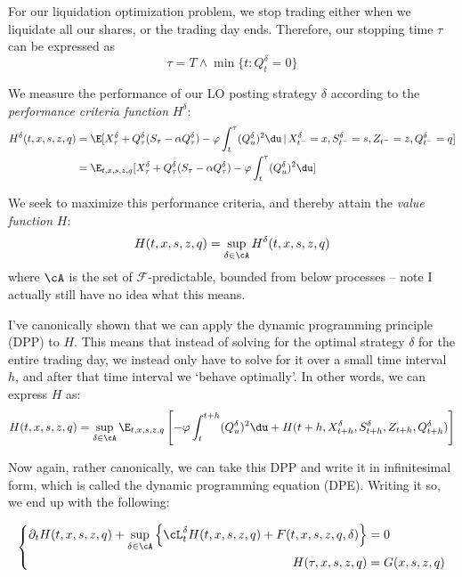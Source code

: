 \documentclass[12pt]{article}
\begin{document}
For our liquidation optimization problem, we stop trading either when we liquidate all our shares, or the trading day ends. Therefore, our stopping time $\tau$ can be expressed as 
\[ \tau = T \wedge \min \{ t: Q_t^\delta = 0 \} \]

We measure the performance of our LO posting strategy $\delta$ according to the \textit{performance criteria function} $H^\delta$:
\begin{align*}
H^\delta (t,x,s,z,q) & = \E [ X_\tau^\delta + Q_\tau^\delta(S_\tau - \alpha Q_\tau^\delta) - \varphi \int_t^\tau (Q_u^\delta)^2 \du \, | \, X_{t^-}^\delta = x, S_{t^-}^\delta = s, Z_{t^-} = z, Q_{t^-}^\delta = q] \\
& = \E_{t,x,s,z,q} [ X_\tau^\delta + Q_\tau^\delta(S_\tau - \alpha Q_\tau^\delta) - \varphi \int_t^\tau (Q_u^\delta)^2 \du ]
\end{align*} 

We seek to maximize this performance criteria, and thereby attain the \textit{value function} $H$:
\[ H(t,x,s,z,q) = \sup_{\delta \in \cA} H^\delta (t,x,s,z,q) \]
where $\cA$ is the set of $\mathcal{F}$-predictable, bounded from below processes -- note I actually still have no idea what this means.

I've canonically shown that we can apply the dynamic programming principle (DPP) to $H$. This means that instead of solving for the optimal strategy $\delta$ for the entire trading day, we instead only have to solve for it over a small time interval $h$, and after that time interval we `behave optimally'. In other words, we can express $H$ as:
\[ H(t,x,s,z,q) = \sup_{\delta \in \cA} \E_{t,x,s,z,q} \left[ -\varphi \int_t^{t+h} (Q_u^\delta)^2 \du + H(t+h, X_{t+h}^\delta, S_{t+h}^\delta, Z_{t+h}, Q_{t+h}^\delta) \right] \]

Now again, rather canonically, we can take this DPP and write it in infinitesimal form, which is called the dynamic programming equation (DPE). Writing it so, we end up with the following:

\begin{equation}\label{eq:ch12dpe}
\begin{split}
\left\lbrace \begin{aligned}
\partial_t H (t,x,s,z,q) + \sup\limits_{\delta \in \cA} \left\lbrace \cL^{\delta}_t H(t,x,s,z,q) + F(t,x,s,z,q,\delta) \right\rbrace & = 0 \\
H(\tau,x,s,z,q) & = G(x,s,z,q) 
\end{aligned} \right.
\end{split}
\end{equation}
\end{document}
